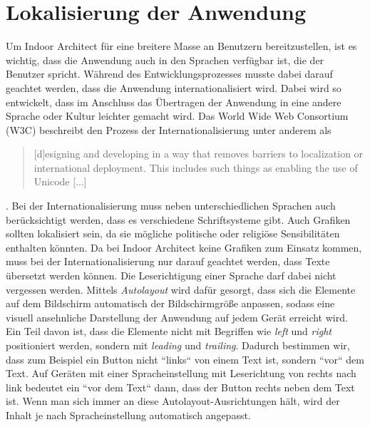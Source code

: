 \section{Lokalisierung der Anwendung}
\label{sec:localizing}
Um Indoor Architect für eine breitere Masse an Benutzern bereitzustellen, ist es wichtig, dass die Anwendung auch in den Sprachen verfügbar ist, die der Benutzer spricht.
Während des Entwicklungsprozesses musste dabei darauf geachtet werden, dass die Anwendung internationalisiert wird.
Dabei wird so entwickelt, dass im Anschluss das Übertragen der Anwendung in eine andere Sprache oder Kultur leichter gemacht wird.
Das World Wide Web Consortium (W3C) beschreibt den Prozess der Internationalisierung unter anderem als \blockquote{[d]esigning and developing in a way that removes barriers to localization or international deployment. This includes such things as enabling the use of Unicode [...]} \parencite{ISH2005}.\pbreak%
%
Bei der Internationalisierung muss neben unterschiedlichen Sprachen auch berücksichtigt werden, dass es verschiedene Schriftsysteme gibt.
Auch Grafiken sollten lokalisiert sein, da sie mögliche politische oder religiöse Sensibilitäten enthalten könnten.
Da bei Indoor Architect keine Grafiken zum Einsatz kommen, muss bei der Internationalisierung nur darauf geachtet werden, dass Texte übersetzt werden können.
Die Leserichtigung einer Sprache darf dabei nicht vergessen werden.
Mittels \emph{Autolayout} wird dafür gesorgt, dass sich die Elemente auf dem Bildschirm automatisch der Bildschirmgröße anpassen, sodass eine visuell ansehnliche Darstellung der Anwendung auf jedem Gerät erreicht wird.
Ein Teil davon ist, dass die Elemente nicht mit Begriffen wie \emph{left} und \emph{right} positioniert werden, sondern mit \emph{leading} und \emph{trailing}.
Dadurch bestimmen wir, dass zum Beispiel ein Button nicht ``links`` von einem Text ist, sondern ``vor`` dem Text.
Auf Geräten mit einer Spracheinstellung mit Leserichtung von rechts nach link bedeutet ein ``vor dem Text`` dann, dass der Button rechts neben dem Text ist.
Wenn man sich immer an diese Autolayout-Ausrichtungen hält, wird der Inhalt je nach Spracheinstellung automatisch angepasst.

